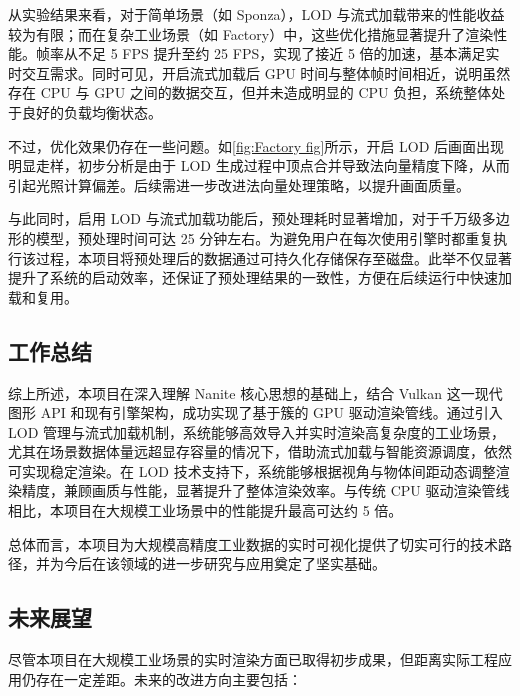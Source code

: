 从实验结果来看，对于简单场景（如 Sponza），LOD 与流式加载带来的性能收益较为有限；而在复杂工业场景（如 Factory）中，这些优化措施显著提升了渲染性能。帧率从不足 5 FPS 提升至约 25 FPS，实现了接近 5 倍的加速，基本满足实时交互需求。同时可见，开启流式加载后 GPU 时间与整体帧时间相近，说明虽然存在 CPU 与 GPU 之间的数据交互，但并未造成明显的 CPU 负担，系统整体处于良好的负载均衡状态。

不过，优化效果仍存在一些问题。如\autoref{fig:Factory fig}所示，开启 LOD 后画面出现明显走样，初步分析是由于 LOD 生成过程中顶点合并导致法向量精度下降，从而引起光照计算偏差。后续需进一步改进法向量处理策略，以提升画面质量。

与此同时，启用 LOD 与流式加载功能后，预处理耗时显著增加，对于千万级多边形的模型，预处理时间可达 25 分钟左右。为避免用户在每次使用引擎时都重复执行该过程，本项目将预处理后的数据通过可持久化存储保存至磁盘\cite{cereal}。此举不仅显著提升了系统的启动效率，还保证了预处理结果的一致性，方便在后续运行中快速加载和复用。

\subsection{工作总结}

综上所述，本项目在深入理解 Nanite 核心思想的基础上，结合 Vulkan 这一现代图形 API 和现有引擎架构，成功实现了基于簇的 GPU 驱动渲染管线。通过引入 LOD 管理与流式加载机制，系统能够高效导入并实时渲染高复杂度的工业场景，尤其在场景数据体量远超显存容量的情况下，借助流式加载与智能资源调度，依然可实现稳定渲染。在 LOD 技术支持下，系统能够根据视角与物体间距动态调整渲染精度，兼顾画质与性能，显著提升了整体渲染效率。与传统 CPU 驱动渲染管线相比，本项目在大规模工业场景中的性能提升最高可达约 5 倍。

总体而言，本项目为大规模高精度工业数据的实时可视化提供了切实可行的技术路径，并为今后在该领域的进一步研究与应用奠定了坚实基础。

\subsection{未来展望}

尽管本项目在大规模工业场景的实时渲染方面已取得初步成果，但距离实际工程应用仍存在一定差距。未来的改进方向主要包括：

